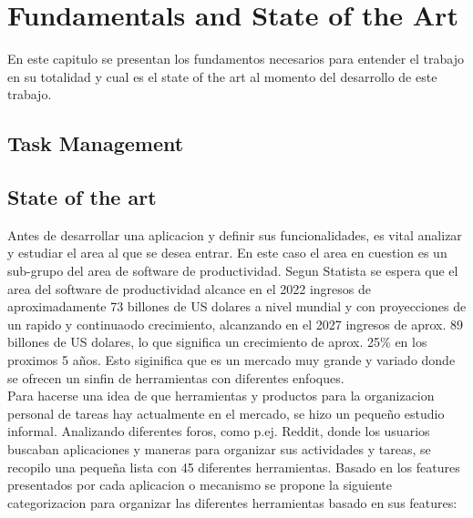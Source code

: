 \chapter{Fundamentals and State of the Art}
En este capitulo se presentan los fundamentos necesarios para entender el trabajo en su totalidad y cual es el state of the art al momento del desarrollo de este trabajo.

\section{Task Management}

\section{State of the art}
\label{sec:stateOfTheArt}
Antes de desarrollar una aplicacion y definir sus funcionalidades, es vital analizar y estudiar el area al que se desea entrar. En este caso el area en cuestion es un sub-grupo del area de software de productividad. Segun Statista se espera que el area del software de productividad alcance en el 2022 ingresos de aproximadamente 73 billones de US dolares a nivel mundial y con proyecciones de un rapido y continuaodo crecimiento, alcanzando en el 2027 ingresos de aprox. 89 billones de US dolares, lo que significa un crecimiento de aprox. 25\% en los proximos 5 años. Esto siginifica que es un mercado muy grande y variado donde se ofrecen un sinfin de herramientas con diferentes enfoques.\\
Para hacerse una idea de que herramientas y productos para la organizacion personal de tareas hay actualmente en el mercado, se hizo un pequeño estudio informal. Analizando diferentes foros, como p.ej. Reddit, donde los usuarios buscaban aplicaciones y maneras para organizar sus actividades y tareas, se recopilo una pequeña lista con 45 diferentes herramientas. Basado en los features presentados por cada aplicacion o mecanismo se propone la siguiente categorizacion para organizar las diferentes herramientas basado en sus features:

